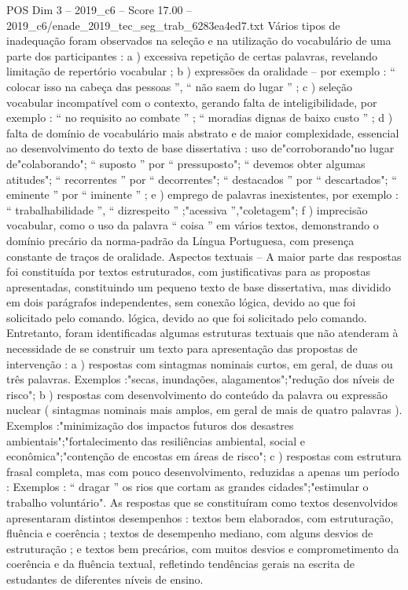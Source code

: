 \begin{textsample}{POS Dim 3 – 2019\_c6 – Score 17.00 – 2019\_c6/enade\_2019\_tec\_seg\_trab\_6283ea4ed7.txt}
Vários tipos de inadequação foram observados na seleção e na utilização do vocabulário de uma parte dos participantes : a ) excessiva repetição de certas palavras, revelando limitação de repertório vocabular ; b ) expressões da oralidade – por exemplo : “ colocar isso na cabeça das pessoas ”, “ não saem do lugar ” ; c ) seleção vocabular incompatível com o contexto, gerando falta de inteligibilidade, por exemplo : “ no requisito ao combate ” ; “ moradias dignas de baixo custo ” ; d ) falta de domínio de vocabulário mais abstrato e de maior complexidade, essencial ao desenvolvimento do texto de base dissertativa : uso de"corroborando"no lugar de"colaborando"; “ suposto ” por “ pressuposto"; “ devemos obter algumas atitudes"; “ recorrentes ” por “ decorrentes"; “ destacados ” por “ descartados"; “ eminente ” por “ iminente ” ; e ) emprego de palavras inexistentes, por exemplo : “ trabalhabilidade ”, “ dizrespeito ” ;"acessiva ”,"coletagem"; f ) imprecisão vocabular, como o uso da palavra “ coisa ” em vários textos, demonstrando o domínio precário da norma-padrão da Língua Portuguesa, com presença constante de traços de oralidade.
Aspectos textuais – A maior parte das respostas foi constituída por textos estruturados, com justificativas para as propostas apresentadas, constituindo um pequeno texto de base dissertativa, mas dividido em dois parágrafos independentes, sem conexão lógica, devido ao que foi solicitado pelo comando. lógica, devido ao que foi solicitado pelo comando.
Entretanto, foram identificadas algumas estruturas textuais que não atenderam à necessidade de se construir um texto para apresentação das propostas de intervenção : a ) respostas com sintagmas nominais curtos, em geral, de duas ou três palavras.
Exemplos :"secas, inundações, alagamentos";"redução dos níveis de risco"; b ) respostas com desenvolvimento do conteúdo da palavra ou expressão nuclear ( sintagmas nominais mais amplos, em geral de mais de quatro palavras ).
Exemplos :"minimização dos impactos futuros dos desastres ambientais";"fortalecimento das resiliências ambiental, social e econômica";"contenção de encostas em áreas de risco"; c ) respostas com estrutura frasal completa, mas com pouco desenvolvimento, reduzidas a apenas um período : Exemplos : “ dragar ” os rios que cortam as grandes cidades";"estimular o trabalho voluntário".
As respostas que se constituíram como textos desenvolvidos apresentaram distintos desempenhos : textos bem elaborados, com estruturação, fluência e coerência ; textos de desempenho mediano, com alguns desvios de estruturação ; e textos bem precários, com muitos desvios e comprometimento da coerência e da fluência textual, refletindo tendências gerais na escrita de estudantes de diferentes níveis de ensino.

\end{textsample}
